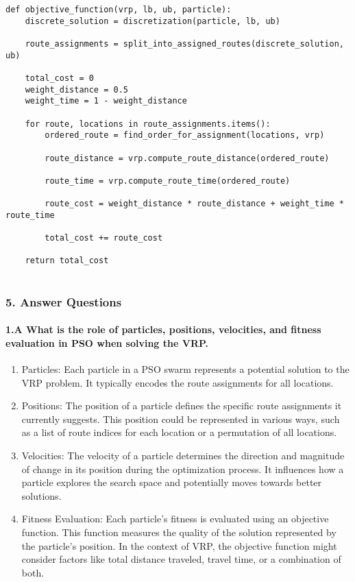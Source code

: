 \documentclass[letterpaper, 12pt]{article}
\begin{document}
\begin{lstlisting}
def objective_function(vrp, lb, ub, particle):
    discrete_solution = discretization(particle, lb, ub)

    route_assignments = split_into_assigned_routes(discrete_solution, ub)

    total_cost = 0
    weight_distance = 0.5  
    weight_time = 1 - weight_distance

    for route, locations in route_assignments.items(): 
        ordered_route = find_order_for_assignment(locations, vrp)

        route_distance = vrp.compute_route_distance(ordered_route)

        route_time = vrp.compute_route_time(ordered_route)

        route_cost = weight_distance * route_distance + weight_time * route_time

        total_cost += route_cost

    return total_cost


\end{lstlisting}

\subsubsection*{5. Answer Questions}
\paragraph{1.A What is the role of particles, positions, velocities, and fitness evaluation in PSO when solving the VRP. }
\begin{enumerate}
    \item Particles: Each particle in a PSO swarm represents a potential solution to the VRP problem. It typically encodes the route assignments for all locations.
    \item Positions: The position of a particle defines the specific route assignments it currently suggests. This position could be represented in various ways, such as a list of route indices for each location or a permutation of all locations.
    \item Velocities: The velocity of a particle determines the direction and magnitude of change in its position during the optimization process. It influences how a particle explores the search space and potentially moves towards better solutions.
    \item Fitness Evaluation: Each particle's fitness is evaluated using an objective function. This function measures the quality of the solution represented by the particle's position. In the context of VRP, the objective function might consider factors like total distance traveled, travel time, or a combination of both.
\end{enumerate}
\end{document}
